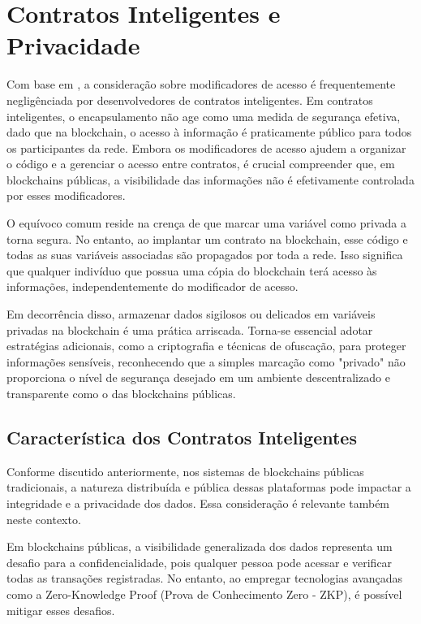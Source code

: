 \chapter{\label{chap:chap2}Contratos Inteligentes e Privacidade}

Com base em  \cite{GGA}, a consideração sobre modificadores de acesso é frequentemente negligênciada por desenvolvedores de contratos inteligentes. Em contratos inteligentes, o encapsulamento não age como uma medida de segurança efetiva, dado que na blockchain, o acesso à informação é praticamente público para todos os participantes da rede. Embora os modificadores de acesso ajudem a organizar o código e a gerenciar o acesso entre contratos, é crucial compreender que, em blockchains públicas, a visibilidade das informações não é efetivamente controlada por esses modificadores.

O equívoco comum reside na crença de que marcar uma variável como privada a torna segura. No entanto, ao implantar um contrato na blockchain, esse código e todas as suas variáveis associadas são propagados por toda a rede. Isso significa que qualquer indivíduo que possua uma cópia do blockchain terá acesso às informações, independentemente do modificador de acesso.

Em decorrência disso, armazenar dados sigilosos ou delicados em variáveis privadas na blockchain é uma prática arriscada. Torna-se essencial adotar estratégias adicionais, como a criptografia e técnicas de ofuscação, para proteger informações sensíveis, reconhecendo que a simples marcação como "privado" não proporciona o nível de segurança desejado em um ambiente descentralizado e transparente como o das blockchains públicas.


\section{Característica dos Contratos Inteligentes}

Conforme discutido anteriormente, nos sistemas de blockchains públicas tradicionais, a natureza distribuída e pública dessas plataformas pode impactar a integridade e a privacidade dos dados. Essa consideração é relevante também neste contexto.

Em blockchains públicas, a visibilidade generalizada dos dados representa um desafio para a confidencialidade, pois qualquer pessoa pode acessar e verificar todas as transações registradas. No entanto, ao empregar tecnologias avançadas como a Zero-Knowledge Proof (Prova de Conhecimento Zero - ZKP), é possível mitigar esses desafios.

